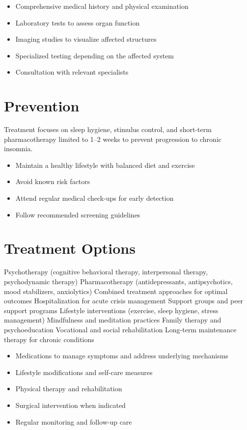 \begin{itemize}[noitemsep]
  \item Comprehensive medical history and physical examination
  \item Laboratory tests to assess organ function
  \item Imaging studies to visualize affected structures
  \item Specialized testing depending on the affected system
  \item Consultation with relevant specialists
\end{itemize}
\section{Prevention}
Treatment focuses on sleep hygiene, stimulus control, and short-term pharmacotherapy limited to 1--2 weeks to prevent progression to chronic insomnia.

\begin{itemize}[noitemsep]
  \item Maintain a healthy lifestyle with balanced diet and exercise
  \item Avoid known risk factors
  \item Attend regular medical check-ups for early detection
  \item Follow recommended screening guidelines
\end{itemize}
\section{Treatment Options}
Psychotherapy (cognitive behavioral therapy, interpersonal therapy, psychodynamic therapy) Pharmacotherapy (antidepressants, antipsychotics, mood stabilizers, anxiolytics) Combined treatment approaches for optimal outcomes Hospitalization for acute crisis management Support groups and peer support programs Lifestyle interventions (exercise, sleep hygiene, stress management) Mindfulness and meditation practices Family therapy and psychoeducation Vocational and social rehabilitation Long-term maintenance therapy for chronic conditions

\begin{itemize}[noitemsep]
  \item Medications to manage symptoms and address underlying mechanisms
  \item Lifestyle modifications and self-care measures
  \item Physical therapy and rehabilitation
  \item Surgical intervention when indicated
  \item Regular monitoring and follow-up care
\end{itemize}
